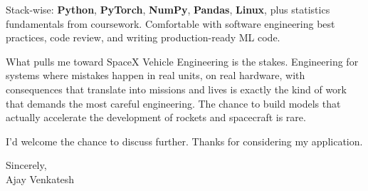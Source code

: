 \documentclass[letterpaper,11pt]{article}
\begin{document}
Stack-wise: \textbf{Python}, \textbf{PyTorch}, \textbf{NumPy}, \textbf{Pandas}, \textbf{Linux}, plus statistics fundamentals from coursework. Comfortable with software engineering best practices, code review, and writing production-ready ML code.

What pulls me toward SpaceX Vehicle Engineering is the stakes. Engineering for systems where mistakes happen in real units, on real hardware, with consequences that translate into missions and lives is exactly the kind of work that demands the most careful engineering. The chance to build models that actually accelerate the development of rockets and spacecraft is rare.

I'd welcome the chance to discuss further. Thanks for considering my application.

\vspace{12pt}
Sincerely, \\
Ajay Venkatesh
\end{document}
